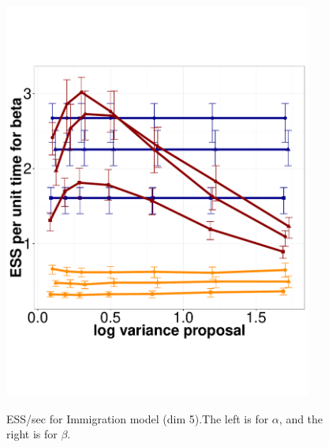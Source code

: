 \begin{figure}
\begin{minipage}[hp]{0.45\linewidth}
    \includegraphics [width=0.90\textwidth, angle=0]{figs/q_5_beta.pdf}
    \vspace{-0 in}
      \label{fig:ESS_Q_D5}
  \end{minipage}
    \caption{ESS/sec for Immigration model (dim 5).The left is for $\alpha$, and the right is for $\beta$.}
  \end{figure}

